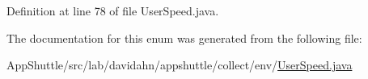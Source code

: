 \-Definition at line 78 of file \-User\-Speed.\-java.



\-The documentation for this enum was generated from the following file\-:\begin{DoxyCompactItemize}
\item 
\-App\-Shuttle/src/lab/davidahn/appshuttle/collect/env/\hyperlink{_user_speed_8java}{\-User\-Speed.\-java}\end{DoxyCompactItemize}
